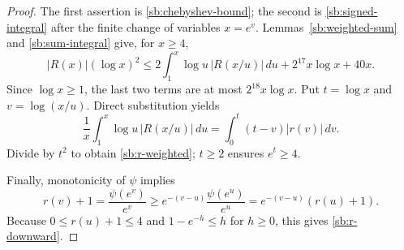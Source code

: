 \begin{proof}
The first assertion is \eqref{sb:chebyshev-bound}; the second is
\eqref{sb:signed-integral} after the finite change of variables
$x=e^v$.  Lemmas~\ref{sb:weighted-sum} and \ref{sb:sum-integral} give,
for $x\ge4$,
\[
 |R(x)|(\log x)^2
 \le2\int_1^x\log u\,|R(x/u)|\,du
                    +2^{17}x\log x+40x.
\]
Since $\log x\ge1$, the last two terms are at most
$2^{18}x\log x$.  Put $t=\log x$ and $v=\log(x/u)$.  Direct
substitution yields
\[
 \frac1x\int_1^x\log u\,|R(x/u)|\,du
       =\int_0^t(t-v)|r(v)|\,dv.
\]
Divide by $t^2$ to obtain \eqref{sb:r-weighted}; $t\ge2$ ensures
$e^t\ge4$.

Finally, monotonicity of $\psi$ implies
\[
 r(v)+1=\frac{\psi(e^v)}{e^v}
       \ge e^{-(v-u)}\frac{\psi(e^u)}{e^u}
       =e^{-(v-u)}(r(u)+1).
\]
Because $0\le r(u)+1\le4$ and $1-e^{-h}\le h$ for $h\ge0$,
this gives \eqref{sb:r-downward}.
\end{proof}

